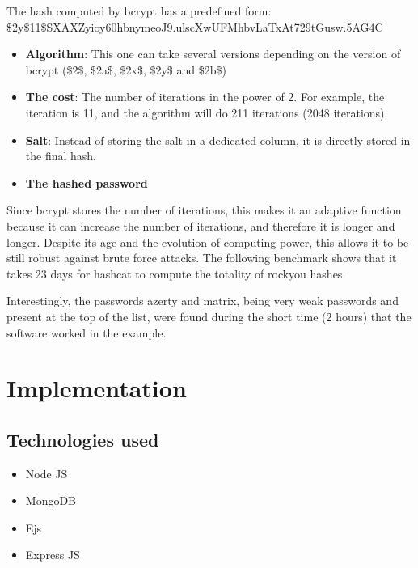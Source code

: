 \documentclass{article}[12pt,a4paper]
\begin{document}
The hash computed by bcrypt has a predefined form:\\
\$2y\$11\$SXAXZyioy60hbnymeoJ9.ulscXwUFMhbvLaTxAt729tGusw.5AG4C
\begin{itemize}
    \item \textbf{Algorithm}: This one can take several versions depending on the version of bcrypt (\$2\$, \$2a\$, \$2x\$, \$2y\$ and \$2b\$)
    \item \textbf{The cost}: The number of iterations in the power of 2. For example, the iteration is 11, and the algorithm will do 211 iterations (2048 iterations).
    \item \textbf{Salt}: Instead of storing the salt in a dedicated column, it is directly stored in the final hash.
\item \textbf{The hashed password}
\end{itemize}

Since bcrypt stores the number of iterations, this makes it an adaptive function because it can increase the number of iterations, and therefore it is longer and longer. Despite its age and the evolution of computing power, this allows it to be still robust against brute force attacks. The following benchmark shows that it takes 23 days for hashcat to compute the totality of rockyou hashes.

Interestingly, the passwords azerty and matrix, being very weak passwords and present at the top of the list, were found during the short time (2 hours) that the software worked in the example. 
\newpage
{}

\section{Implementation}
\subsection{Technologies used}
\begin{itemize}
    \item Node JS
    \item MongoDB 
    \item Ejs
    \item Express JS
\end{itemize}
\end{document}
